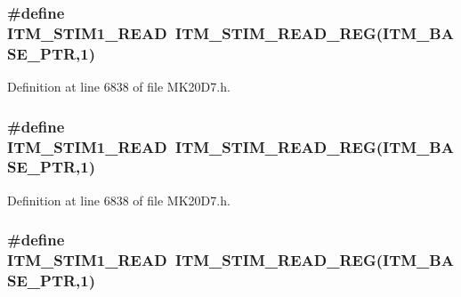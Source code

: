 \subsubsection[{\texorpdfstring{I\+T\+M\+\_\+\+S\+T\+I\+M1\+\_\+\+R\+E\+AD}{ITM_STIM1_READ}}]{\setlength{\rightskip}{0pt plus 5cm}\#define I\+T\+M\+\_\+\+S\+T\+I\+M1\+\_\+\+R\+E\+AD~{\bf I\+T\+M\+\_\+\+S\+T\+I\+M\+\_\+\+R\+E\+A\+D\+\_\+\+R\+EG}({\bf I\+T\+M\+\_\+\+B\+A\+S\+E\+\_\+\+P\+TR},1)}\hypertarget{group___i_t_m___register___accessor___macros_ga0539c5b663891628a5157b9e06be3327}{}\label{group___i_t_m___register___accessor___macros_ga0539c5b663891628a5157b9e06be3327}


Definition at line 6838 of file M\+K20\+D7.\+h.

\subsubsection[{\texorpdfstring{I\+T\+M\+\_\+\+S\+T\+I\+M1\+\_\+\+R\+E\+AD}{ITM_STIM1_READ}}]{\setlength{\rightskip}{0pt plus 5cm}\#define I\+T\+M\+\_\+\+S\+T\+I\+M1\+\_\+\+R\+E\+AD~{\bf I\+T\+M\+\_\+\+S\+T\+I\+M\+\_\+\+R\+E\+A\+D\+\_\+\+R\+EG}({\bf I\+T\+M\+\_\+\+B\+A\+S\+E\+\_\+\+P\+TR},1)}\hypertarget{group___i_t_m___register___accessor___macros_ga0539c5b663891628a5157b9e06be3327}{}\label{group___i_t_m___register___accessor___macros_ga0539c5b663891628a5157b9e06be3327}


Definition at line 6838 of file M\+K20\+D7.\+h.

\subsubsection[{\texorpdfstring{I\+T\+M\+\_\+\+S\+T\+I\+M1\+\_\+\+R\+E\+AD}{ITM_STIM1_READ}}]{\setlength{\rightskip}{0pt plus 5cm}\#define I\+T\+M\+\_\+\+S\+T\+I\+M1\+\_\+\+R\+E\+AD~{\bf I\+T\+M\+\_\+\+S\+T\+I\+M\+\_\+\+R\+E\+A\+D\+\_\+\+R\+EG}({\bf I\+T\+M\+\_\+\+B\+A\+S\+E\+\_\+\+P\+TR},1)}\hypertarget{group___i_t_m___register___accessor___macros_ga0539c5b663891628a5157b9e06be3327}{}\label{group___i_t_m___register___accessor___macros_ga0539c5b663891628a5157b9e06be3327}



